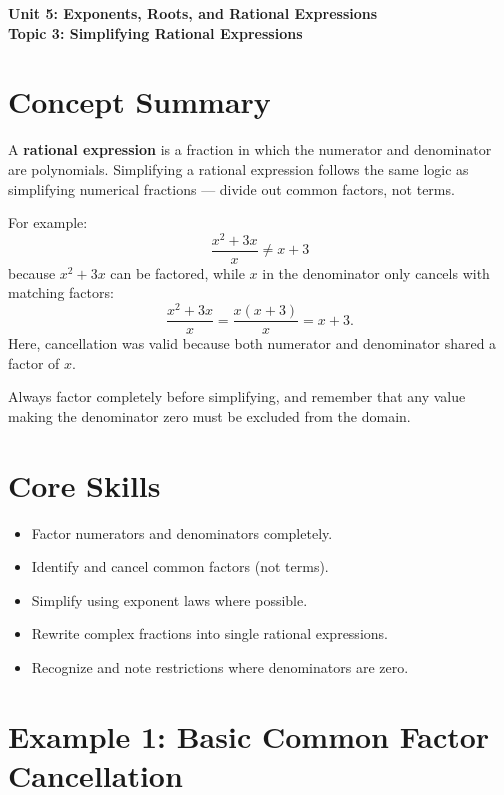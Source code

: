 \documentclass[14pt]{extarticle}
\begin{document}
\raggedright
{}

\begin{center}
    \LARGE \textbf{Unit 5: Exponents, Roots, and Rational Expressions} \\[6pt]
    \Large \textbf{Topic 3: Simplifying Rational Expressions}
\end{center}

\vspace{1em}

\section*{Concept Summary}

A \textbf{rational expression} is a fraction in which the numerator and denominator are polynomials.  
Simplifying a rational expression follows the same logic as simplifying numerical fractions — divide out common factors, not terms.

For example:
\[
\frac{x^2 + 3x}{x} \ne x + 3
\]
because \(x^2 + 3x\) can be factored, while \(x\) in the denominator only cancels with matching factors:
\[
\frac{x^2 + 3x}{x} = \frac{x(x + 3)}{x} = x + 3.
\]
Here, cancellation was valid because both numerator and denominator shared a factor of \(x\).

Always factor completely before simplifying, and remember that any value making the denominator zero must be excluded from the domain.

\section*{Core Skills}
\begin{itemize}
  \item Factor numerators and denominators completely.
  \item Identify and cancel common factors (not terms).
  \item Simplify using exponent laws where possible.
  \item Rewrite complex fractions into single rational expressions.
  \item Recognize and note restrictions where denominators are zero.
\end{itemize}

\section*{Example 1: Basic Common Factor Cancellation}
\end{document}
